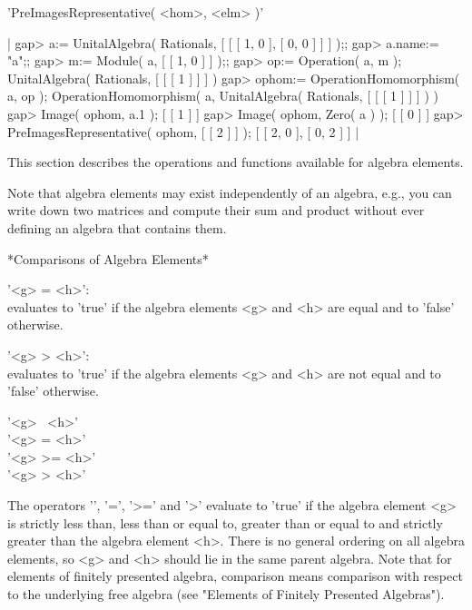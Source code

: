 \vspace{5mm}
'PreImagesRepresentative( <hom>, <elm> )'

|    gap> a:= UnitalAlgebra( Rationals, [ [ [ 1, 0 ], [ 0, 0 ] ] ] );;
    gap> a.name:= "a";;
    gap> m:= Module( a, [ [ 1, 0 ] ] );;
    gap> op:= Operation( a, m );
    UnitalAlgebra( Rationals, [ [ [ 1 ] ] ] )
    gap> ophom:= OperationHomomorphism( a, op );
    OperationHomomorphism( a, UnitalAlgebra( Rationals, [ [ [ 1 ] ] ] ) )
    gap> Image( ophom, a.1 );
    [ [ 1 ] ]
    gap> Image( ophom, Zero( a ) );
    [ [ 0 ] ]
    gap> PreImagesRepresentative( ophom, [ [ 2 ] ] );
    [ [ 2, 0 ], [ 0, 2 ] ] |

%
%
%
%
%
%
%
%
%

This section  describes the operations and  functions available
for algebra  elements.

Note  that algebra elements  may  exist independently of an algebra,
e.g., you  can write down two  matrices  and  compute  their sum and
product without ever defining an algebra that contains them.

\vspace{5mm}

*Comparisons of Algebra Elements*

'<g> = <h>': \\
evaluates to 'true'  if the algebra  elements <g>
and  <h> are  equal and  to 'false' otherwise.

'<g> \<> <h>': \\
evaluates to 'true' if the algebra elements <g> and <h> are not equal
and to 'false' otherwise.

'<g> \<\ <h>' \\
'<g> \<= <h>' \\
'<g> >= <h>' \\
'<g> > <h>'

The operators '\<', '\<=', '>=' and '>' evaluate to 'true'  if  the algebra
element <g> is strictly less than, less than or equal to, greater than or
equal to  and strictly greater than the  algebra element <h>.  There  is no
general ordering on all algebra  elements, so <g> and <h> should lie in
the same parent algebra.  Note that for elements of finitely presented
algebra, comparison means comparison with respect to the underlying free
algebra (see "Elements of Finitely Presented Algebras").

